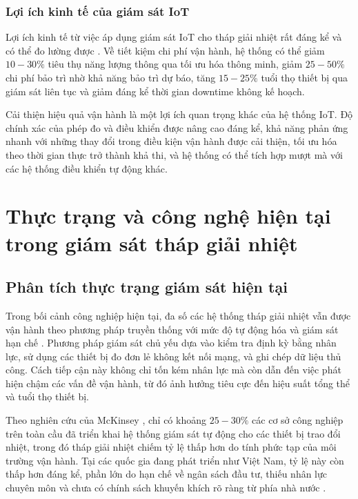\documentclass[../main.tex]{subfiles}
\begin{document}
\subsubsection{Lợi ích kinh tế của giám sát IoT}
Lợi ích kinh tế từ việc áp dụng giám sát IoT cho tháp giải nhiệt rất đáng kể và có thể đo lường được \cite{mckinsey2023digital}. Về tiết kiệm chi phí vận hành, hệ thống có thể giảm $10{-}30\%$ tiêu thụ năng lượng thông qua tối ưu hóa thông minh, giảm $25{-}50\%$ chi phí bảo trì nhờ khả năng bảo trì dự báo, tăng $15{-}25\%$ tuổi thọ thiết bị qua giám sát liên tục và giảm đáng kể thời gian downtime không kế hoạch.

Cải thiện hiệu quả vận hành là một lợi ích quan trọng khác của hệ thống IoT. Độ chính xác của phép đo và điều khiển được nâng cao đáng kể, khả năng phản ứng nhanh với những thay đổi trong điều kiện vận hành được cải thiện, tối ưu hóa theo thời gian thực trở thành khả thi, và hệ thống có thể tích hợp mượt mà với các hệ thống điều khiển tự động khác.

\section{Thực trạng và công nghệ hiện tại trong giám sát tháp giải nhiệt}
\label{sec:current_state_technologies}

\subsection{Phân tích thực trạng giám sát hiện tại}
\label{sec:current_monitoring_state}

Trong bối cảnh công nghiệp hiện tại, đa số các hệ thống tháp giải nhiệt vẫn được vận hành theo phương pháp truyền thống với mức độ tự động hóa và giám sát hạn chế \cite{wang2023smart}. Phương pháp giám sát chủ yếu dựa vào kiểm tra định kỳ bằng nhân lực, sử dụng các thiết bị đo đơn lẻ không kết nối mạng, và ghi chép dữ liệu thủ công. Cách tiếp cận này không chỉ tốn kém nhân lực mà còn dẫn đến việc phát hiện chậm các vấn đề vận hành, từ đó ảnh hưởng tiêu cực đến hiệu suất tổng thể và tuổi thọ thiết bị.

Theo nghiên cứu của McKinsey \cite{mckinsey2023digital}, chỉ có khoảng $25{-}30\%$ các cơ sở công nghiệp trên toàn cầu đã triển khai hệ thống giám sát tự động cho các thiết bị trao đổi nhiệt, trong đó tháp giải nhiệt chiếm tỷ lệ thấp hơn do tính phức tạp của môi trường vận hành. Tại các quốc gia đang phát triển như Việt Nam, tỷ lệ này còn thấp hơn đáng kể, phần lớn do hạn chế về ngân sách đầu tư, thiếu nhân lực chuyên môn và chưa có chính sách khuyến khích rõ ràng từ phía nhà nước \cite{vietnam2021energy}.
\end{document}
